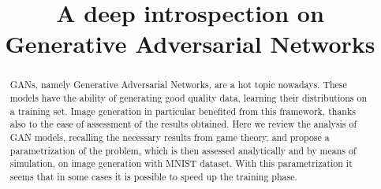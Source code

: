 \documentclass[article,10pt]{IEEEtran}
\begin{document}
	\title{A deep introspection on Generative Adversarial Networks}
	
	\author{
		
		}
	
	\maketitle		
	
	\begin{abstract}
		GANs, namely Generative Adversarial Networks, are a hot topic nowadays. These models have the ability of generating good quality data, learning their distributions on a training set. Image generation in particular benefited from this framework, thanks also to the ease of assessment of the results obtained. Here we review the analysis of GAN models, recalling the necessary results from game theory, and propose a parametrization of the problem, which is then assessed analytically and by means of simulation, on image generation with MNIST dataset. With this parametrization it seems that in some cases it is possible to speed up the training phase.
	\end{abstract}
	
	
	
	
	
	
	
	
	
	
	
\end{document}

